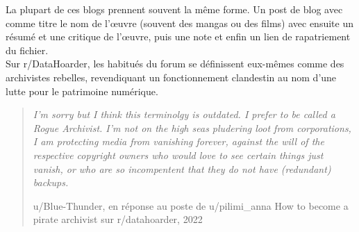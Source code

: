 La plupart de ces blogs prennent souvent la même forme. Un post de blog avec comme titre le nom de l'œuvre (souvent des mangas ou des films) avec ensuite un résumé et une critique de l'œuvre, puis une note et enfin un lien de rapatriement du fichier.\\


Sur r/DataHoarder, les habitués du forum se définissent eux-mêmes comme des archivistes rebelles, revendiquant un fonctionnement clandestin au nom d'une lutte pour le patrimoine numérique. 

\begin{quote}
    \textit{I'm sorry but I think this terminolgy is outdated. I prefer to be called a Rogue Archivist. I'm not on the high seas pludering loot from corporations, I am protecting media from vanishing forever, against the will of the respective copyright owners who would love to see certain things just vanish, or who are so incompentent that they do not have (redundant) backups.}

    u/Blue-Thunder, en réponse au poste de u/pilimi\_anna \og  How to become a pirate archivist \fg sur r/datahoarder, 2022
\end{quote}

